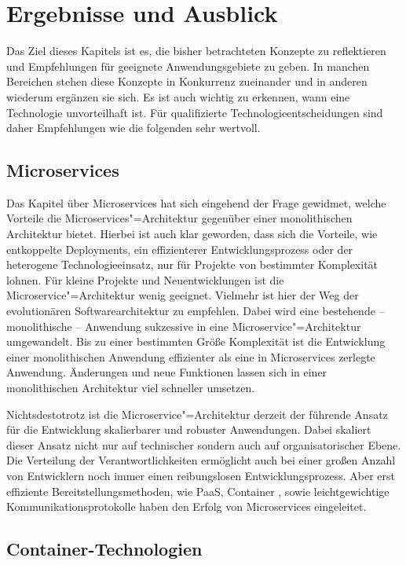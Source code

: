\chapter{Ergebnisse und Ausblick}

Das Ziel dieses Kapitels ist es, die bisher betrachteten Konzepte zu reflektieren und Empfehlungen für geeignete Anwendungsgebiete zu geben. In manchen Bereichen stehen diese Konzepte in Konkurrenz zueinander und in anderen wiederum ergänzen sie sich. Es ist auch wichtig zu erkennen, wann eine Technologie unvorteilhaft ist. Für qualifizierte Technologieentscheidungen sind daher Empfehlungen wie die folgenden sehr wertvoll. 

\section{Microservices}

Das Kapitel über Microservices hat sich eingehend der Frage gewidmet, welche Vorteile die Microservices"=Architektur gegenüber einer monolithischen Architektur bietet. Hierbei ist auch klar geworden, dass sich die Vorteile, wie entkoppelte Deployments, ein effizienterer Entwicklungsprozess oder der heterogene Technologieeinsatz, nur für Projekte von bestimmter Komplexität lohnen. Für kleine Projekte und Neuentwicklungen ist die Microservice"=Architektur wenig geeignet. Vielmehr ist hier der Weg der evolutionären Softwarearchitektur zu empfehlen. Dabei wird eine bestehende -- \zB monolithische -- Anwendung sukzessive in eine Microservice"=Architektur umgewandelt. Bis zu einer bestimmten Größe \bzw Komplexität ist die Entwicklung einer monolithischen Anwendung effizienter als eine in Microservices zerlegte Anwendung. Änderungen und neue Funktionen lassen sich in einer monolithischen Architektur viel schneller umsetzen.

Nichtsdestotrotz ist die Microservice"=Architektur derzeit der führende Ansatz für die Entwicklung skalierbarer und robuster Anwendungen. Dabei skaliert dieser Ansatz nicht nur auf technischer sondern auch auf organisatorischer Ebene. Die Verteilung der Verantwortlichkeiten ermöglicht auch bei einer großen Anzahl von Entwicklern noch immer einen reibungslosen Entwicklungsprozess. Aber erst effiziente Bereitstellungsmethoden, wie PaaS, Container \ua, sowie leichtgewichtige Kommunikationsprotokolle haben den Erfolg von Microservices eingeleitet.

\section{Container-Technologien}

